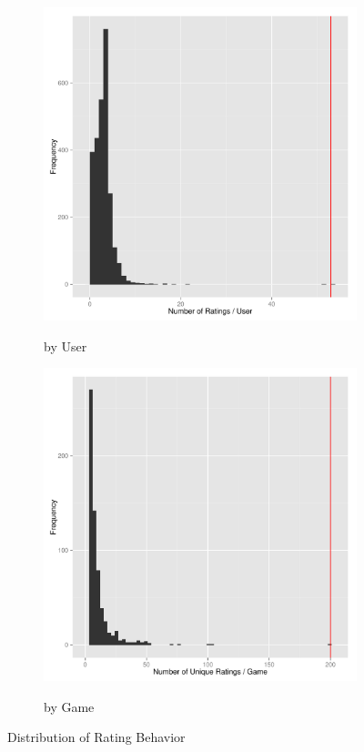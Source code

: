 \begin{figure}
\centering
\begin{subfigure}[b]{0.49\textwidth}
\caption{by User}
\includegraphics[width=\textwidth]{histo_users.pdf}
\label{fig:histo_users}
\end{subfigure}
\hfill
\begin{subfigure}[b]{0.49\textwidth}
\caption{by Game}
\includegraphics[width=\textwidth]{histo_games.pdf}
\label{fig:histo_games}
\end{subfigure}
\caption{Distribution of Rating Behavior}
\end{figure}

